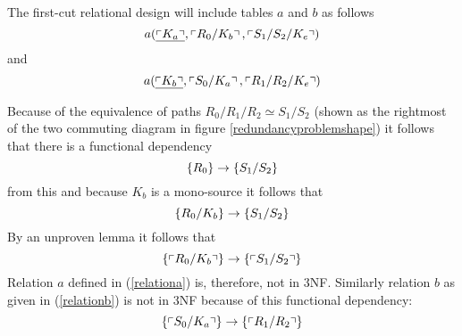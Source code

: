 The first-cut relational design will include tables $a$ and $b$ as follows
\begin{equation}
\label{relationa}
a(\underline{\left\ulcorner K_a\right\urcorner},\left\ulcorner R_0/K_b\right\urcorner,\left\ulcorner S_1/S_2/K_e\right\urcorner)
\end{equation}
and
\begin{equation}
\label{relationb}
a(\underline{\left\ulcorner K_b\right\urcorner},\left\ulcorner S_0/K_a\right\urcorner,\left\ulcorner R_1/R_2/K_e\right\urcorner)
\end{equation}

Because of the equivalence of paths $R_0/R_1/R_2 \simeq S_1/S_2$ (shown as the rightmost of the two
commuting diagram in figure \ref{redundancyproblemshape}) it follows that 
there is a functional dependency
\begin{equation}
\left\{R_0\right\} \rightarrow \left\{S_1/S_2\right\}
\end{equation}
from this and because $K_b$ is a mono-source it follows that
\begin{equation}
\left\{R_0/K_b\right\} \rightarrow \left\{S_1/S_2\right\}
\end{equation}
By an unproven lemma it follows that 
\begin{equation}
\left\{\left\ulcorner R_0/K_b\right\urcorner\right\} \rightarrow \left\{\left\ulcorner S_1/S_2\right\urcorner\right\}
\end{equation}
Relation $a$ defined in (\ref{relationa}) is, therefore, not in 3NF. Similarly relation $b$ as given in
(\ref{relationb}) is not in 3NF because of this functional dependency:
\begin{equation}
\left\{\left\ulcorner S_0/K_a\right\urcorner\right\} \rightarrow \left\{\left\ulcorner R_1/R_2\right\urcorner\right\}
\end{equation}

